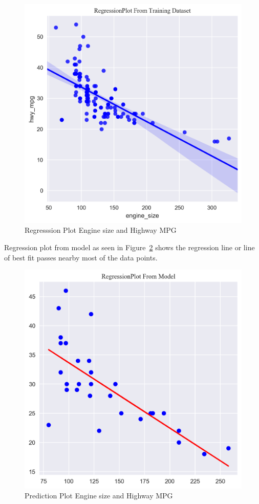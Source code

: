  \begin{figure}[!h]
  \includegraphics[scale=1.0]{images/reg_plot.png}
  \caption{Regresssion Plot Engine size and Highway MPG}
\label{fig:regplt}
\end{figure}
 
 
 Regression plot from model as seen in Figure~\ref{fig:predplt} shows 
 the regression line or line of best fit passes nearby most of the data
 points. 
 
 \begin{figure}[htb]
  \includegraphics[scale=1.0]{images/plot_pred_test_set.png}
  \caption{Prediction Plot Engine size and Highway MPG}
  \label{fig:predplt}
\end{figure}
 
